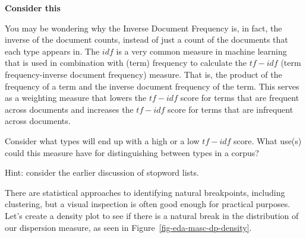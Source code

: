 \documentclass[
  letterpaper,
  DIV=11,
  numbers=noendperiod]{scrreport}
\theoremstyle{definition}
\theoremstyle{remark}
\begin{document}
\begin{tcolorbox}[enhanced jigsaw, breakable, colback=white, rightrule=.15mm, arc=.35mm, left=2mm, toprule=.15mm, leftrule=.75mm, bottomrule=.15mm, opacityback=0]

\textbf{ Consider this}

You may be wondering why the Inverse Document Frequency is, in fact, the
inverse of the document counts, instead of just a count of the documents
that each type appears in. The \(idf\) is a very common measure in
machine learning that is used in combination with (term) frequency to
calculate the \(tf-idf\) (term frequency-inverse document frequency)
measure. That is, the product of the frequency of a term and the inverse
document frequency of the term. This serves as a weighting measure that
lowers the \(tf-idf\) score for terms that are frequent across documents
and increases the \(tf-idf\) score for terms that are infrequent across
documents.

Consider what types will end up with a high or a low \(tf-idf\) score.
What use(s) could this measure have for distinguishing between types in
a corpus?

Hint: consider the earlier discussion of stopword lists.

\end{tcolorbox}

There are statistical approaches to identifying natural breakpoints,
including clustering, but a visual inspection is often good enough for
practical purposes. Let's create a density plot to see if there is a
natural break in the distribution of our dispersion measure, as seen in
Figure~\ref{fig-eda-masc-dp-density}.
\end{document}
